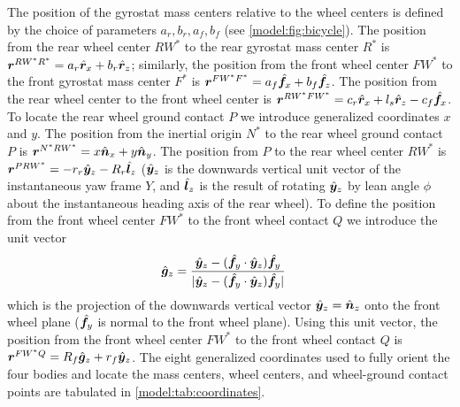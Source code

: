 The position of the gyrostat mass centers relative to the wheel centers is
defined by the choice of parameters $a_r, b_r, a_f, b_f$ (see
\autoref{model:fig:bicycle}). The position from the rear wheel center $RW^*$ to
the rear gyrostat mass center $R^*$ is $\boldsymbol{r}^{RW^*R^*} = a_r \hat{\boldsymbol{r}}_{x} + b_r
\hat{\boldsymbol{r}}_{z}$; similarly, the position from the front wheel center $FW^*$ to the
front gyrostat mass center $F^*$ is $\boldsymbol{r}^{FW^*F^*} = a_f \hat{\boldsymbol{f}}_{x} + b_f
\hat{\boldsymbol{f}}_{z}$. The position from the rear wheel center to the front wheel center
is $\boldsymbol{r}^{RW^*FW^*} = c_r \hat{\boldsymbol{r}}_{x} + l_s \hat{\boldsymbol{r}}_{z} - c_f \hat{\boldsymbol{f}}_{x}$. To
locate the rear wheel ground contact $P$ we introduce generalized coordinates
$x$ and $y$. The position from the inertial origin $N^*$ to the rear wheel
ground contact $P$ is $\boldsymbol{r}^{N^*RW^*} = x \hat{\boldsymbol{n}}_{x} + y \hat{\boldsymbol{n}}_{y}$. The
position from $P$ to the rear wheel center $RW^*$ is $\boldsymbol{r}^{PRW^*} = - r_r
\hat{\boldsymbol{y}}_{z} - R_r \hat{\boldsymbol{l}}_{z}$ ($\hat{\boldsymbol{y}}_{z}$ is the downwards vertical unit vector
of the instantaneous yaw frame $Y$, and $\hat{\boldsymbol{l}}_{z}$ is the result of rotating
$\hat{\boldsymbol{y}}_{z}$ by lean angle $\phi$ about the instantaneous heading axis of the
rear wheel). To define the position from the front wheel center $FW^*$ to the
front wheel contact $Q$ we introduce the unit vector
\begin{align}
  \hat{\boldsymbol{g}}_{z} &= \frac{\hat{\boldsymbol{y}}_{z} - (\hat{\boldsymbol{f}}_{y} \cdot \hat{\boldsymbol{y}}_{z})
  \hat{\boldsymbol{f}}_{y}}{|\hat{\boldsymbol{y}}_{z} - (\hat{\boldsymbol{f}}_{y} \cdot \hat{\boldsymbol{y}}_{z})
  \hat{\boldsymbol{f}}_{y}|}
\end{align}
which is the projection of the downwards vertical vector $\hat{\boldsymbol{y}}_{z}=\hat{\boldsymbol{n}}_{z}$
onto the front wheel plane ($\hat{\boldsymbol{f}}_{y}$ is normal to the front wheel plane).
Using this unit vector, the position from the front wheel center $FW^*$ to the
front wheel contact $Q$ is $\boldsymbol{r}^{FW^*Q} = R_f \hat{\boldsymbol{g}}_{z} + r_f \hat{\boldsymbol{y}}_{z}$.
The eight generalized coordinates used to fully orient the four bodies and
locate the mass centers, wheel centers, and wheel-ground contact points are
tabulated in \autoref{model:tab:coordinates}.
